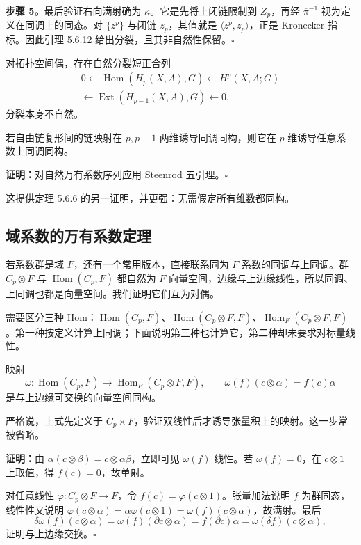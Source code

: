\textbf{步骤 5。}最后验证右向满射确为 $\kappa$。它是先将上闭链限制到 $Z_p$，再经 $\overline\pi^{-1}$ 视为定义在同调上的同态。对 $\{z^p\}$ 与闭链 $z_p$，其值就是 $\langle z^p,z_p\rangle$，正是 Kronecker 指标。因此引理 5.6.12 给出分裂，且其非自然性保留。\hfill$\square$

对拓扑空间偶，存在自然分裂短正合列
\[
\begin{split}
0\leftarrow\operatorname{Hom}(H_p(X,A),G)\leftarrow H^p(X,A;G)\\
\leftarrow\operatorname{Ext}(H_{p-1}(X,A),G)\leftarrow0,
\end{split}
\]
分裂本身不自然。

若自由链复形间的链映射在 $p,p-1$ 两维诱导同调同构，则它在 $p$ 维诱导任意系数上同调同构。

\textbf{证明：}对自然万有系数序列应用 Steenrod 五引理。\hfill$\square$

这提供定理 5.6.6 的另一证明，并更强：无需假定所有维数都同构。

\subsection*{域系数的万有系数定理}
若系数群是域 $F$，还有一个常用版本，直接联系同为 $F$ 系数的同调与上同调。群 $C_p\otimes F$ 与 $\operatorname{Hom}(C_p,F)$ 都自然为 $F$ 向量空间，边缘与上边缘线性，所以同调、上同调也都是向量空间。我们证明它们互为对偶。

需要区分三种 Hom：$\operatorname{Hom}(C_p,F)$、$\operatorname{Hom}(C_p\otimes F,F)$、$\operatorname{Hom}_F(C_p\otimes F,F)$。第一种按定义计算上同调；下面说明第三种也计算它，第二种却未要求对标量线性。

映射
\[
\omega:\operatorname{Hom}(C_p,F)\to\operatorname{Hom}_F(C_p\otimes F,F),\qquad
\omega(f)(c\otimes\alpha)=f(c)\alpha
\]
是与上边缘可交换的向量空间同构。

严格说，上式先定义于 $C_p\times F$，验证双线性后才诱导张量积上的映射。这一步常被省略。

\textbf{证明：}由 $\alpha(c\otimes\beta)=c\otimes\alpha\beta$，立即可见 $\omega(f)$ 线性。若 $\omega(f)=0$，在 $c\otimes1$ 上取值，得 $f(c)=0$，故单射。

对任意线性 $\varphi:C_p\otimes F\to F$，令 $f(c)=\varphi(c\otimes1)$。张量加法说明 $f$ 为群同态，线性性又说明 $\varphi(c\otimes\alpha)=\alpha\varphi(c\otimes1)=\omega(f)(c\otimes\alpha)$，故满射。最后
\[
\delta\omega(f)(c\otimes\alpha)=\omega(f)(\partial c\otimes\alpha)
=f(\partial c)\alpha=\omega(\delta f)(c\otimes\alpha),
\]
证明与上边缘交换。\hfill$\square$

